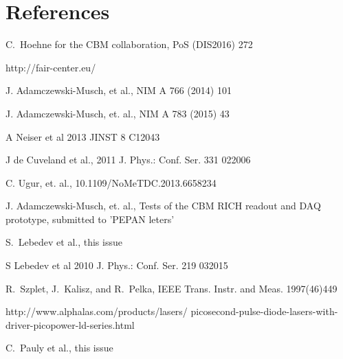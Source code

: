 \documentclass[final,5p,times,twocolumn]{elsarticle}
\begin{document}
\section*{References}

\begin{thebibliography}{99}

C.~Hoehne for the CBM collaboration,
PoS (DIS2016) 272

http://fair-center.eu/



J. Adamczewski-Musch, et al.,
NIM A 766 (2014) 101

J. Adamczewski-Musch, et. al.,
NIM A 783 (2015) 43

A Neiser et al 2013 JINST 8 C12043

J de Cuveland et al., 2011 J. Phys.: Conf. Ser. 331 022006

C. Ugur, et. al.,
10.1109/NoMeTDC.2013.6658234

J. Adamczewski-Musch, et. al.,
Tests of the CBM RICH readout and DAQ prototype,
submitted to 'PEPAN leters'

S.~Lebedev et al.,
this issue

S Lebedev et al 2010 J. Phys.: Conf. Ser. 219 032015 

R.~Szplet, J.~Kalisz, and R.~Pelka,
IEEE Trans. Instr. and Meas. 1997(46)449

http://www.alphalas.com/products/lasers/ picosecond-pulse-diode-lasers-with-driver-picopower-ld-series.html

C.~Pauly et al.,
this issue

\end{thebibliography}

\end{document}
